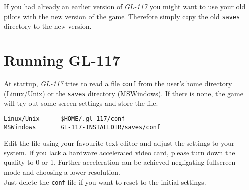 If you had already an earlier version of \emph{GL-117} you might want to use your
old pilots with the new version of the game. Therefore simply copy the old
\texttt{saves} directory to the new version.


\section{Running GL-117}
\label{sec:running_gl117}

At startup, \emph{GL-117} tries to read a file \texttt{conf} from the user's home
directory (Linux/Unix) or the \texttt{saves} directory (MSWindows).
If there is none, the game will try out some screen settings and store the file.
\begin{verbatim}
Linux/Unix      $HOME/.gl-117/conf
MSWindows       GL-117-INSTALLDIR/saves/conf
\end{verbatim}

Edit the file using your favourite text editor and adjust the settings
to your system.
If you lack a hardware accelerated video card, please turn down the
quality to 0 or 1. Further acceleration can be achieved negligating fullscreen mode
and choosing a lower resolution.\\
Just delete the \texttt{conf} file if you want to reset to the initial settings.

